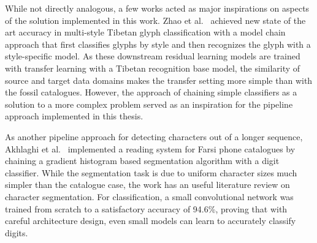 \documentclass[english,twoside,openright]{UH_DS_MSc}
\begin{document}
While not directly analogous, a few works acted as major inspirations on aspects of the solution implemented in this work.
Zhao et al.~\cite{4zhaoTibetan} achieved new state of the art accuracy in multi-style Tibetan glyph classification
with a model chain approach that first classifies glyphs by style and then recognizes the glyph with a style-specific model. As these downstream
 residual learning models are trained with transfer learning with a Tibetan 
 recognition base model, the similarity of source and target data domains makes the transfer setting more simple than with
the fossil catalogues. However, the approach of 
  chaining simple classifiers as a solution to a more complex problem served as an inspiration for
   the pipeline approach implemented in this thesis.





As another pipeline approach for detecting characters out of a longer sequence, Akhlaghi et al.~\cite{1akhlaghiFarsi} implemented 
a reading system for Farsi phone catalogues by chaining a gradient histogram based segmentation 
algorithm with a digit classifier. While the segmentation task is due to uniform character
 sizes much simpler than the catalogue case, the work has an useful literature review on
  character segmentation. For classification, a small convolutional network was trained
   from scratch to a satisfactory accuracy of 94.6\%, proving that with careful architecture design,
    even small models can learn to accurately classify digits.
\end{document}
